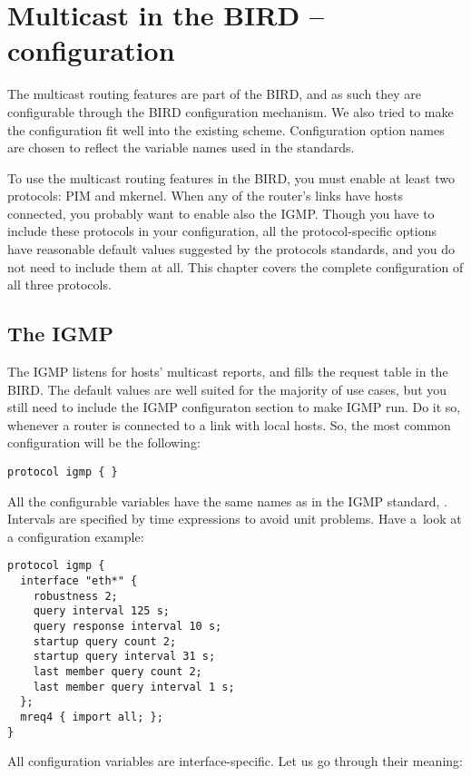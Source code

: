 \chapter{Multicast in the BIRD -- configuration}

The multicast routing features are part of the BIRD, and as such they are
configurable through the BIRD configuration mechanism. We also tried to make
the configuration fit well into the existing scheme. Configuration option
names are chosen to reflect the variable names used in the standards.

To use the multicast routing features in the BIRD, you must enable at least two
protocols: PIM and mkernel. When any of the router's links have hosts
connected, you probably want to enable also the IGMP. Though you have to
include these protocols in your configuration, all the protocol-specific
options have reasonable default values suggested by the protocols standards, and
you do not need to include them at all. This chapter covers the complete
configuration of all three protocols.

\section{The IGMP}

The IGMP listens for hosts' multicast reports, and fills the request table in
the BIRD. The default values are well suited for the majority of use cases, but
you still need to include the IGMP configuraton section to make IGMP run. Do it
so, whenever a router is connected to a link with local hosts. So, the most
common configuration will be the following:

\begin{lstlisting}
protocol igmp { }
\end{lstlisting}

\noindent All the configurable variables have the same names as in the IGMP standard, .
Intervals are specified by time expressions to avoid unit problems. Have a~look
at a configuration example:

\begin{lstlisting}
protocol igmp {
  interface "eth*" {
    robustness 2;
    query interval 125 s;
    query response interval 10 s;
    startup query count 2;
    startup query interval 31 s;
    last member query count 2;
    last member query interval 1 s;
  };
  mreq4 { import all; };
}
\end{lstlisting}

\noindent All configuration variables are interface-specific. Let us go through their meaning:

